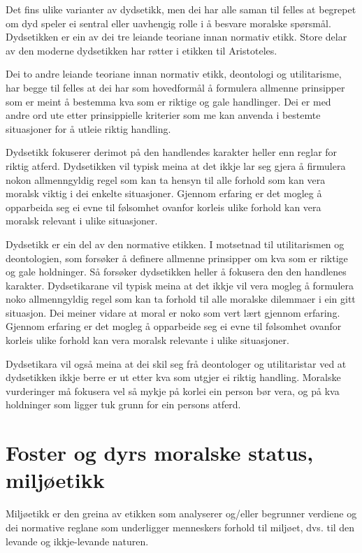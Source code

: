\documentclass[a4paper]{IEEEtran}
\begin{document}
Det fins ulike varianter av dydsetikk, men dei har alle saman til felles at begrepet om dyd speler ei sentral eller uavhengig rolle i å besvare moralske spørsmål. Dydsetikken er ein av dei tre leiande teoriane innan normativ etikk. Store delar av den moderne dydsetikken har røtter i etikken til Aristoteles.\bigskip

Dei to andre leiande teoriane innan normativ etikk, deontologi og utilitarisme, har begge til felles at dei har som hovedformål å formulera allmenne prinsipper som er meint å bestemma kva som er riktige og gale handlinger. Dei er med andre ord ute etter prinsippielle kriterier som me kan anvenda i bestemte situasjoner for å utleie riktig handling.\bigskip

Dydsetikk fokuserer derimot på den handlendes karakter heller enn reglar for riktig atferd. Dydsetikken vil typisk meina at det ikkje lar seg gjera å firmulera nokon allmenngyldig regel som kan ta hensyn til alle forhold som kan vera moralsk viktig i dei enkelte situasjoner. Gjennom erfaring er det mogleg å opparbeida seg ei evne til følsomhet ovanfor korleis ulike forhold kan vera moralsk relevant i ulike situasjoner.\bigskip

Dydsetikk er ein del av den normative etikken. I motsetnad til utilitarismen og deontologien, som forsøker å definere allmenne prinsipper om kva som er riktige og gale holdninger. Så forsøker dydsetikken heller å fokusera den den handlenes karakter. Dydsetikarane vil typisk meina at det ikkje vil vera mogleg å formulera noko allmenngyldig regel som kan ta forhold til alle moralske dilemmaer i ein gitt situasjon. Dei meiner vidare at moral er noko som vert lært gjennom erfaring. Gjennom erfaring er det mogleg å opparbeide seg ei evne til følsomhet ovanfor korleis ulike forhold kan vera moralsk relevante i ulike situasjoner. 

Dydsetikara vil også meina at dei skil seg frå deontologer og utilitaristar ved at dydsetikken ikkje berre er ut etter kva som utgjer ei riktig handling. Moralske vurderinger må fokusera vel så mykje på korlei ein person bør vera, og på kva holdninger som ligger tuk grunn for ein persons atferd. \bigskip


\section{Foster og dyrs moralske status, miljøetikk}
\label{fdms}\bigskip

Miljøetikk er den greina av etikken som analyserer og/eller begrunner verdiene og dei normative reglane som underligger menneskers forhold til miljøet, dvs. til den levande og ikkje-levande naturen.\bigskip
\end{document}
